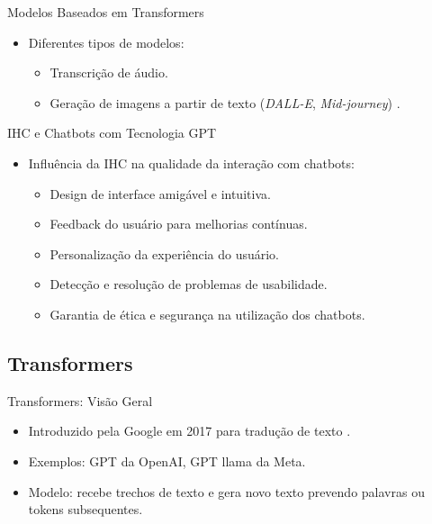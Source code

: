 \documentclass{beamer}
\begin{document}
\begin{frame}{Modelos Baseados em Transformers}
    \begin{itemize}
        \item Diferentes tipos de modelos:
        \begin{itemize}
            \item Transcrição de áudio.
            \item Geração de imagens a partir de texto (\textit{DALL-E}, \textit{Mid-journey}) \cite{Attention-Is-All-You-Need}.
        \end{itemize}
    \end{itemize}
\end{frame}

\begin{frame}{IHC e Chatbots com Tecnologia GPT}
    \begin{itemize}
        \item Influência da IHC na qualidade da interação com chatbots:
        \begin{itemize}
            \item Design de interface amigável e intuitiva.
            \item Feedback do usuário para melhorias contínuas.
            \item Personalização da experiência do usuário.
            \item Detecção e resolução de problemas de usabilidade.
            \item Garantia de ética e segurança na utilização dos chatbots.
        \end{itemize}
    \end{itemize}
\end{frame}

\subsection{Transformers}

\begin{frame}{Transformers: Visão Geral}
    \begin{itemize}
        \item Introduzido pela Google em 2017 para tradução de texto \cite{Attention-Is-All-You-Need}.
        \item Exemplos: GPT da OpenAI, GPT llama da Meta.
        \item Modelo: recebe trechos de texto e gera novo texto prevendo palavras ou tokens subsequentes.
    \end{itemize}
\end{frame}
\end{document}
